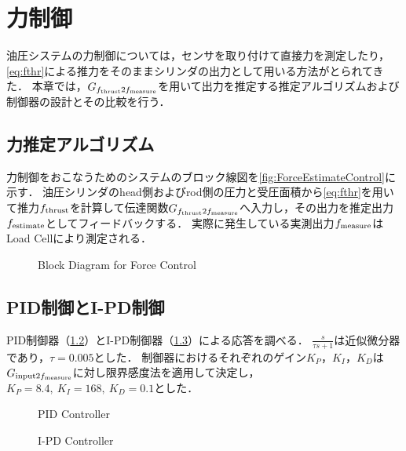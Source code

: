 \chapter{力制御}
油圧システムの力制御については，センサを取り付けて直接力を測定したり，\eqnname\ref{eq:fthr}による推力をそのままシリンダの出力として用いる方法がとられてきた\cite{semini2010design,semini2010hyq,川端健太郎20141a1,岡田大貴2017多自由度油圧駆動ロボットのシリンダ圧に基づく手先負荷力推定による力覚フィードバック}．
本章では，$G_{f_\mathrm{thrust}2f_\mathrm{measure}}$を用いて出力を推定する推定アルゴリズムおよび制御器の設計とその比較を行う．

\section{力推定アルゴリズム}
力制御をおこなうためのシステムのブロック線図を\figname\ref{fig:ForceEstimateControl}に示す．
油圧シリンダのhead側およびrod側の圧力と受圧面積から\eqnname\ref{eq:fthr}を用いて推力$f_\mathrm{thrust}$を計算して伝達関数$G_{f_\mathrm{thrust}2f_\mathrm{measure}}$へ入力し，その出力を推定出力$f_\mathrm{estimate}$としてフィードバックする．
実際に発生している実測出力$f_\mathrm{measure}$はLoad Cellにより測定される．

\begin{figure}[t]
    \centering
        
        \caption{Block Diagram for Force Control}
        \label{fig4:ForceEstimateControl}
\end{figure}
\section{PID制御とI-PD制御}
PID制御器（\figname\ref{fig4:PID}）とI-PD制御器（\figname\ref{fig4:IPD}）による応答を調べる．
$\frac{s}{\tau s+1}$は近似微分器であり，$\tau=0.005$とした．
制御器におけるそれぞれのゲイン$K_P$，$K_I$，$K_D$は$G_{\mathrm{input}2f_\mathrm{measure}}$に対し限界感度法を適用して決定し，$K_P=8.4,~K_I =168,~K_D=0.1$とした．
\begin{figure}[t]
    \centering
        
        \caption{PID Controller}
        \label{fig4:PID}
\end{figure}
\begin{figure}[t]
    \begin{minipage}{0.5\hsize}
    \centering
        
        \caption{I-PD Controller}
        \label{fig4:IPD}
    \end{minipage}
\end{figure}

